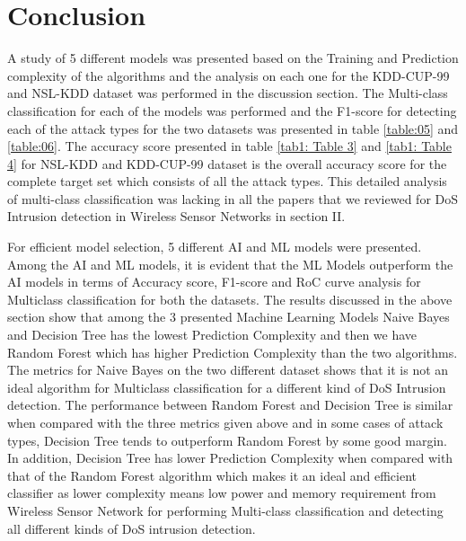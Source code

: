 \documentclass[conference]{IEEEtran}
\begin{document}
\section{Conclusion}
A study of 5 different models was presented based on the Training and Prediction complexity of the algorithms and the analysis on each one for the KDD-CUP-99 and NSL-KDD dataset was performed in the discussion section. The Multi-class classification for each of the models was performed and the F1-score for detecting each of the attack types for the two datasets was presented in table \ref{table:05} and \ref{table:06}. The accuracy score presented in table \ref{tab1: Table 3} and \ref{tab1: Table 4} for NSL-KDD and KDD-CUP-99 dataset is the overall accuracy score for the complete target set which consists of all the attack types. This detailed analysis of multi-class classification was lacking in all the papers that we reviewed for DoS Intrusion detection in Wireless Sensor Networks in section II.

For efficient model selection, 5 different AI and ML models were presented. Among the AI and ML models, it is evident that the ML Models outperform the AI models in terms of Accuracy score, F1-score and RoC curve analysis for Multiclass classification for both the datasets. The results discussed in the above section show that among the 3 presented Machine Learning Models Naive Bayes and Decision Tree has the lowest Prediction Complexity and then we have Random Forest which has higher Prediction Complexity than the two algorithms. The metrics for Naive Bayes on the two different dataset \cite{KDDcup99} shows that it is not an ideal algorithm for Multiclass classification for a different kind of DoS Intrusion detection. The performance between Random Forest \cite{random_forest} and Decision Tree \cite{CART} is similar when compared with the three metrics given above and in some cases of attack types, Decision Tree tends to outperform Random Forest by some good margin.  In addition, Decision Tree has lower Prediction Complexity when compared with that of the Random Forest algorithm which makes it an ideal and efficient classifier as lower complexity means low power and memory requirement from Wireless Sensor Network for performing Multi-class classification and detecting all different kinds of DoS intrusion detection.

\end{document}
